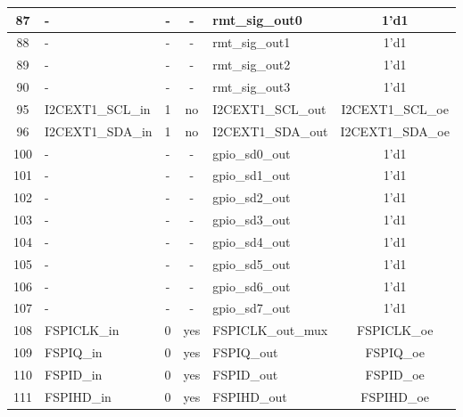 \begin{longtable}[c]{|c|l|c|c|l|c|}
 87  &                        -  &  -  &    -  &          rmt\_sig\_out0  &               1'd1  \\\hline
 88  &                        -  &  -  &    -  &          rmt\_sig\_out1  &               1'd1  \\\hline
 89  &                        -  &  -  &    -  &          rmt\_sig\_out2  &               1'd1  \\\hline
 90  &                        -  &  -  &    -  &          rmt\_sig\_out3  &               1'd1  \\\hline
 95  &         I2CEXT1\_SCL\_in  &  1  &   no  &       I2CEXT1\_SCL\_out  &   I2CEXT1\_SCL\_oe  \\\hline
 96  &         I2CEXT1\_SDA\_in  &  1  &   no  &       I2CEXT1\_SDA\_out  &   I2CEXT1\_SDA\_oe  \\\hline
100  &                        -  &  -  &    -  &          gpio\_sd0\_out  &               1'd1  \\\hline
101  &                        -  &  -  &    -  &          gpio\_sd1\_out  &               1'd1  \\\hline
102  &                        -  &  -  &    -  &          gpio\_sd2\_out  &               1'd1  \\\hline
103  &                        -  &  -  &    -  &          gpio\_sd3\_out  &               1'd1  \\\hline
104  &                        -  &  -  &    -  &          gpio\_sd4\_out  &               1'd1  \\\hline
105  &                        -  &  -  &    -  &          gpio\_sd5\_out  &               1'd1  \\\hline
106  &                        -  &  -  &    -  &          gpio\_sd6\_out  &               1'd1  \\\hline
107  &                        -  &  -  &    -  &          gpio\_sd7\_out  &               1'd1  \\\hline
108  &              FSPICLK\_in  &  0  &  yes  &       FSPICLK\_out\_mux  &        FSPICLK\_oe  \\\hline
109  &                FSPIQ\_in  &  0  &  yes  &              FSPIQ\_out  &          FSPIQ\_oe  \\\hline
110  &                FSPID\_in  &  0  &  yes  &              FSPID\_out  &          FSPID\_oe  \\\hline
111  &               FSPIHD\_in  &  0  &  yes  &             FSPIHD\_out  &         FSPIHD\_oe  \\\hline

\end{longtable}
